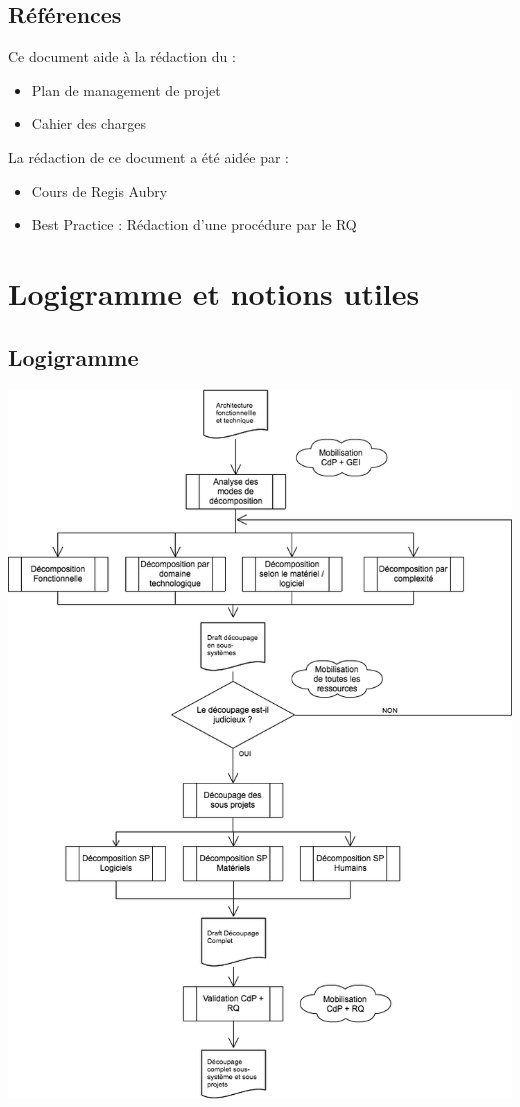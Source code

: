 \subsection{Références}
Ce document aide à la rédaction du :
\begin{itemize}
\item Plan de management de projet
\item Cahier des charges
\end{itemize}

\medskip 

La rédaction de ce document a été aidée par :
\begin{itemize}
\item Cours de Regis Aubry
\item Best Practice : Rédaction d'une procédure par le RQ
\end{itemize}


\section{Logigramme et notions utiles}
\subsection{Logigramme}
\begin {center}
\includegraphics[width=\textwidth]{png/DecompositionSousSystem.png}
\end {center}

